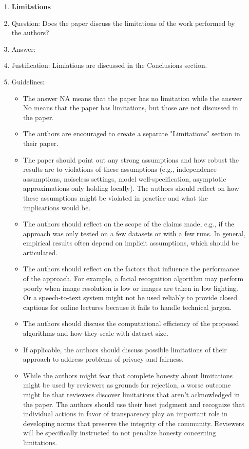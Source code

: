 \documentclass{article}
\theoremstyle{plain}
\theoremstyle{definition}
\theoremstyle{remark}
\theoremstyle{plain}
\begin{document}
\begin{enumerate}
\item {\bf Limitations}
    \item[] Question: Does the paper discuss the limitations of the work performed by the authors?
    \item[] Answer: \answerYes{} %
    \item[] Justification: Limiations are discussed in the Conclusions section.
    \item[] Guidelines:
    \begin{itemize}
        \item The answer NA means that the paper has no limitation while the answer No means that the paper has limitations, but those are not discussed in the paper. 
        \item The authors are encouraged to create a separate "Limitations" section in their paper.
        \item The paper should point out any strong assumptions and how robust the results are to violations of these assumptions (e.g., independence assumptions, noiseless settings, model well-specification, asymptotic approximations only holding locally). The authors should reflect on how these assumptions might be violated in practice and what the implications would be.
        \item The authors should reflect on the scope of the claims made, e.g., if the approach was only tested on a few datasets or with a few runs. In general, empirical results often depend on implicit assumptions, which should be articulated.
        \item The authors should reflect on the factors that influence the performance of the approach. For example, a facial recognition algorithm may perform poorly when image resolution is low or images are taken in low lighting. Or a speech-to-text system might not be used reliably to provide closed captions for online lectures because it fails to handle technical jargon.
        \item The authors should discuss the computational efficiency of the proposed algorithms and how they scale with dataset size.
        \item If applicable, the authors should discuss possible limitations of their approach to address problems of privacy and fairness.
        \item While the authors might fear that complete honesty about limitations might be used by reviewers as grounds for rejection, a worse outcome might be that reviewers discover limitations that aren't acknowledged in the paper. The authors should use their best judgment and recognize that individual actions in favor of transparency play an important role in developing norms that preserve the integrity of the community. Reviewers will be specifically instructed to not penalize honesty concerning limitations.
    \end{itemize}


\end{enumerate}
\end{document}
